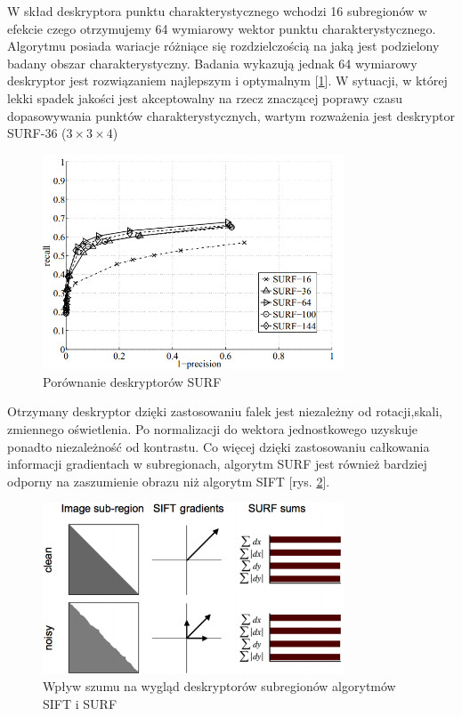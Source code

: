 W skład deskryptora punktu charakterystycznego wchodzi 16 subregionów w efekcie czego otrzymujemy 64 wymiarowy wektor punktu charakterystycznego. Algorytmu posiada wariacje różniące się rozdzielczością na jaką jest podzielony badany obszar charakterystyczny. Badania \cite{HB08} wykazują jednak 64 wymiarowy deskryptor jest rozwiązaniem najlepszym i optymalnym [\ref{fig:surf_bay_compare}]. W sytuacji, w której lekki spadek jakości jest akceptowalny na rzecz znaczącej poprawy czasu dopasowywania punktów charakterystycznych, wartym rozważenia jest deskryptor SURF-36 ($3\times3\times4$)
\begin{figure}[!htb]
\centering
\includegraphics[width=0.8\textwidth]{pict/02/surf/surf_bay_compare_dim.png}
\caption{Porównanie deskryptorów SURF}
\label{fig:surf_bay_compare}
\end{figure}


Otrzymany deskryptor dzięki zastosowaniu falek jest niezależny od rotacji,skali, zmiennego  oświetlenia. Po normalizacji do wektora jednostkowego uzyskuje ponadto niezależność od kontrastu. Co więcej dzięki zastosowaniu całkowania informacji gradientach w subregionach, algorytm SURF jest również bardziej odporny na zaszumienie obrazu niż algorytm SIFT [rys. \ref{fig:surf_bay_clean_noisy}]. 
\begin{figure}[!htb]
\centering
\includegraphics[width=0.8\textwidth]{pict/02/surf/surf_bay_clean_noisy.png}
\caption{Wpływ szumu na wygląd deskryptorów subregionów algorytmów SIFT i SURF}
\label{fig:surf_bay_clean_noisy}
\end{figure}
\FloatBarrier
\newpage
